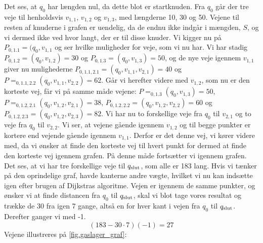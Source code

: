  


Det ses, at $q_0$ har længden nul, da dette blot er startknuden. Fra $q_0$ går der tre veje til henholdsvis $v_{1,1}$, $v_{1,2}$ og $v_{1,3}$, med længderne 10, 30 og 50. Vejene til resten af knuderne i grafen er uendelig, da de endnu ikke indgår i mængden, $S$, og vi dermed ikke ved hvor langt, der er til disse knuder. Vi kigger nu på $P_{0,1.1}=(q_0, v_{1,1}$ og ser hvilke muligheder for veje, som vi nu har. Vi har stadig $P_{0,1.2}=(q_{0},v_{1,2})=30$ og $P_{0,1.3}=(q_{0},v_{1,3})=50$, og de nye veje igennem $v_{1,1}$ giver nu mulighederne $P_{0,1.1,2.1}=(q_{0},v_{1,1},v_{2,1})=40$ og $P=_{0,1.1,2.2}(q_{0},v_{1,1},v_{2,2})=62$. Går vi herefter videre med $v_{1,2}$, som nu er den korteste vej, får vi på samme måde vejene: $P=_{0,1.3}(q_{0},v_{1,3})=50$, $P=_{0,1.2,2.1}(q_{0},v_{1,2},v_{2,1})=38$, $P_{0,1.2,2.2}=(q_{0},v_{1,2},v_{2,2})=60$ og $P_{0,1.2,2.3}=(q_{0},v_{1,2},v_{2,3})=82$. Vi har nu to forskellige veje fra $q_{0}$ til $v_{2,1}$ og to veje fra $q_{0}$ til $v_{2,2}$. Vi ser, at vejene gående igennem $v_{1,2}$ og til begge punkter er kortere end vejende gående igennem $v_{1,1}$. Derfor er det denne vej, vi kører videre med, da vi ønsker at finde den korteste vej til hvert punkt for dermed at finde den korteste vej igennem grafen. På denne måde fortsætter vi igennem grafen. Det ses, at vi har tre forskellige veje til $q_{\textrm{slut}}$, som alle er 183 lang. Hvis vi tænker på den oprindelige graf, havde kanterne andre vægte, hvilket vi nu kan indsætte igen efter brugen af Dijkstras algoritme. Vejen er igennem de samme punkter, og ønsker vi at finde distancen fra $q_{0}$ til $q_{\textrm{slut}}$, skal vi blot tage vores resultat og trække de 30 fra igen 7 gange, altså en for hver kant i vejen fra $q_{0}$ til $q_{\textrm{slut}}$. Derefter ganger vi med -1.
\begin{equation}
(183-30 \cdot 7) (-1) = 27
\end{equation}
Vejene illustreres på \autoref{fig.gaslager_graf}:





